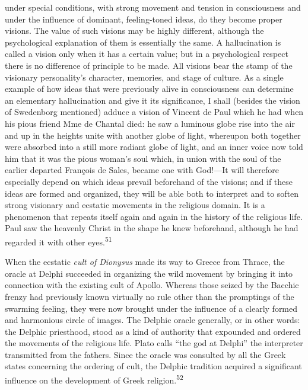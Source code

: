 \documentclass[12pt,a4paper]{book}
\begin{document}
under special conditions, with strong movement and tension in consciousness and under the
influence of dominant, feeling-toned ideas, do they become proper visions. The value of such
visions may be highly different, although the psychological explanation of them is essentially
the same. A hallucination is called a vision only when it has a certain value; but in a
psychological respect there is no difference of principle to be made. All visions bear the stamp
of the visionary personality's character, memories, and stage of culture. As a single example of
how ideas that were previously alive in consciousness can determine an elementary hallucination
and give it its significance, I shall (besides the vision of Swedenborg mentioned) adduce a
vision of Vincent de Paul which he had when his pious friend Mme de Chantal died: he saw a
luminous globe rise into the air and up in the heights unite with another globe of light,
whereupon both together were absorbed into a still more radiant globe of light, and an inner
voice now told him that it was the pious woman's soul which, in union with the soul of the
earlier departed François de Sales, became one with God!---It will therefore especially depend on
which ideas prevail beforehand of the visions; and if these ideas are formed and organized, they
will be able both to interpret and to soften strong visionary and ecstatic movements in the
religious domain. It is a phenomenon that repeats itself again and again in the history of the
religious life. Paul saw the heavenly Christ in the shape he knew beforehand, although he had
regarded it with other eyes.\textsuperscript{51}

When the ecstatic \emph{cult of Dionysus} made its way to Greece from Thrace, the oracle at
Delphi succeeded in organizing the wild movement by bringing it into connection with the existing
cult of Apollo. Whereas those seized by the Bacchic frenzy had previously known virtually no rule
other than the promptings of the swarming feeling, they were now brought under the influence of a
clearly formed and harmonious circle of images. The Delphic oracle generally, or in other words:
the Delphic priesthood, stood as a kind of authority that expounded and ordered the movements of
the religious life. Plato calls ``the god at Delphi'' the interpreter transmitted from the
fathers. Since the oracle was consulted by all the Greek states concerning the ordering of cult,
the Delphic tradition acquired a significant influence on the development of Greek
religion.\textsuperscript{52}
\end{document}
